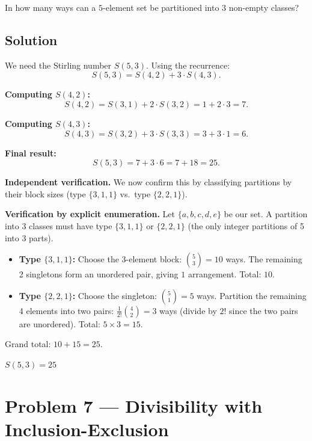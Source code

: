 \documentclass[12pt, a4paper]{article}
\begin{document}
\begin{problembox}
In how many ways can a $5$-element set be partitioned into $3$ non-empty classes?
\end{problembox}

\subsection*{Solution}

We need the Stirling number $S(5,3)$. Using the recurrence:
\[
  S(5,3) = S(4,2) + 3 \cdot S(4,3).
\]

\textbf{Computing $S(4,2)$:}
\[
  S(4,2) = S(3,1) + 2 \cdot S(3,2) = 1 + 2 \cdot 3 = 7.
\]

\textbf{Computing $S(4,3)$:}
\[
  S(4,3) = S(3,2) + 3 \cdot S(3,3) = 3 + 3 \cdot 1 = 6.
\]

\textbf{Final result:}
\[
  S(5,3) = 7 + 3 \cdot 6 = 7 + 18 = 25.
\]

\textbf{Independent verification.}\; We now confirm this by classifying partitions by their block sizes (type $\{3,1,1\}$ vs.\ type $\{2,2,1\}$).

\textbf{Verification by explicit enumeration.}\;
Let $\{a,b,c,d,e\}$ be our set. A partition into 3 classes must have
type $\{3,1,1\}$ or $\{2,2,1\}$ (the only integer partitions of 5 into 3 parts).

\begin{itemize}[nosep]
  \item \textbf{Type $\{3,1,1\}$:}\;
        Choose the 3-element block: $\binom{5}{3} = 10$ ways.
        The remaining 2 singletons form an unordered pair, giving $1$ arrangement.
        Total: $10$.
  \item \textbf{Type $\{2,2,1\}$:}\;
        Choose the singleton: $\binom{5}{1} = 5$ ways.
        Partition the remaining 4 elements into two pairs:
        $\frac{1}{2!}\binom{4}{2} = 3$ ways (divide by $2!$ since the two pairs
        are unordered).
        Total: $5 \times 3 = 15$.
\end{itemize}

Grand total: $10 + 15 = 25$. \;\checkmark

\begin{answerbox}
\centering $S(5,3) = \boxed{25}$
\end{answerbox}

\newpage
\section{Problem 7 --- Divisibility with Inclusion-Exclusion}
\end{document}
